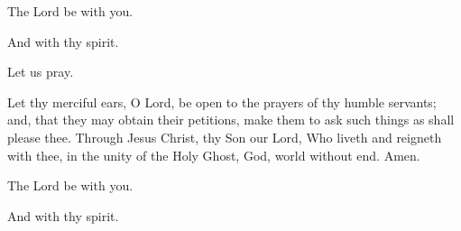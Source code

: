 

\rubric{\Vbar}The Lord be with you.

\rubric{\Rbar}And with thy spirit.

Let us pray.

Let thy merciful ears, O Lord, be open to the prayers of thy humble servants; and, that they may obtain their petitions, make them to ask such things as shall please thee. Through Jesus Christ, thy Son our Lord, Who liveth and reigneth with thee, in the unity of the Holy Ghost, God, world without end. \rubric{\Rbar} Amen.

\rubric{\Vbar}The Lord be with you.

\rubric{\Rbar}And with thy spirit.
